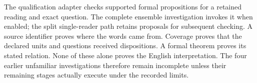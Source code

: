 The qualification adapter checks supported formal propositions for a retained
reading and exact question. The complete ensemble investigation invokes it when
enabled; the split single-reader path retains proposals for subsequent checking.
A source identifier proves where the words came from. Coverage proves that the
declared units and questions received dispositions. A formal theorem proves its
stated relation. None of these alone proves the English interpretation. The
four earlier unfamiliar investigations therefore remain incomplete unless their
remaining stages actually execute under the recorded limits.

\endgroup
\clearpage

